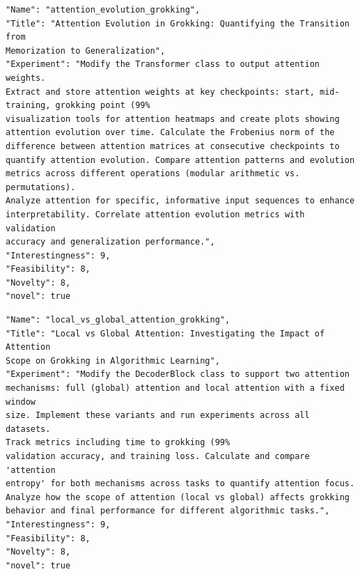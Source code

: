 \begin{tcolorbox}[breakable,colback=blue!5!white, colframe=blue!75!black, title=Idea 5/50 - \texttt{attention\_evolution\_grokking}]
\small
\begin{verbatim}
"Name": "attention_evolution_grokking",
"Title": "Attention Evolution in Grokking: Quantifying the Transition from
Memorization to Generalization",
"Experiment": "Modify the Transformer class to output attention weights.
Extract and store attention weights at key checkpoints: start, mid-
training, grokking point (99%
visualization tools for attention heatmaps and create plots showing
attention evolution over time. Calculate the Frobenius norm of the
difference between attention matrices at consecutive checkpoints to
quantify attention evolution. Compare attention patterns and evolution
metrics across different operations (modular arithmetic vs. permutations).
Analyze attention for specific, informative input sequences to enhance
interpretability. Correlate attention evolution metrics with validation
accuracy and generalization performance.",
"Interestingness": 9,
"Feasibility": 8,
"Novelty": 8,
"novel": true
\end{verbatim}
\end{tcolorbox}

\begin{tcolorbox}[breakable,colback=blue!5!white, colframe=blue!75!black, title=Idea 6/50 - \texttt{local\_vs\_global\_attention\_grokking}]
\small
\begin{verbatim}
"Name": "local_vs_global_attention_grokking",
"Title": "Local vs Global Attention: Investigating the Impact of Attention
Scope on Grokking in Algorithmic Learning",
"Experiment": "Modify the DecoderBlock class to support two attention
mechanisms: full (global) attention and local attention with a fixed window
size. Implement these variants and run experiments across all datasets.
Track metrics including time to grokking (99%
validation accuracy, and training loss. Calculate and compare 'attention
entropy' for both mechanisms across tasks to quantify attention focus.
Analyze how the scope of attention (local vs global) affects grokking
behavior and final performance for different algorithmic tasks.",
"Interestingness": 9,
"Feasibility": 8,
"Novelty": 8,
"novel": true
\end{verbatim}
\end{tcolorbox}

